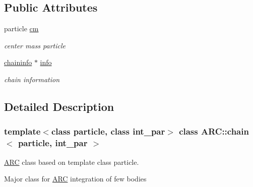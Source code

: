 \subsection*{Public Attributes}
\begin{DoxyCompactItemize}
\item 
particle \hyperlink{classARC_1_1chain_a2eead75bd916fa7ffc05341645527847}{cm}
\begin{DoxyCompactList}\small\item\em center mass particle \end{DoxyCompactList}\item 
\hyperlink{classARC_1_1chaininfo}{chaininfo} $\ast$ \hyperlink{classARC_1_1chain_a7ad20a60e038d16522c11d7fccb47648}{info}
\begin{DoxyCompactList}\small\item\em chain information \end{DoxyCompactList}\end{DoxyCompactItemize}


\subsection{Detailed Description}
\subsubsection*{template$<$class particle, class int\+\_\+par$>$\newline
class A\+R\+C\+::chain$<$ particle, int\+\_\+par $>$}

\hyperlink{namespaceARC}{A\+RC} class based on template class particle. 

Major class for \hyperlink{namespaceARC}{A\+RC} integration of few bodies

